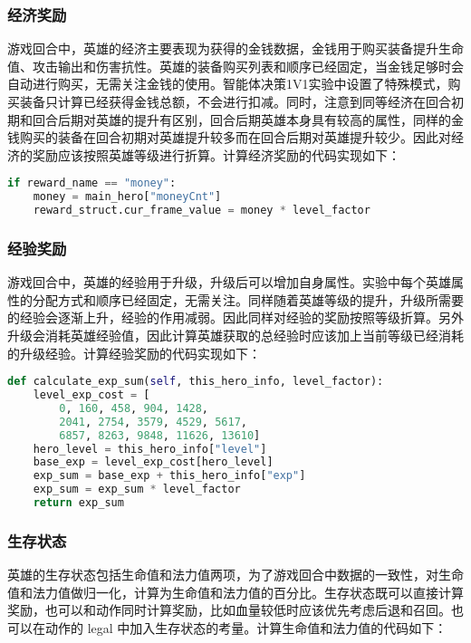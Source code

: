 \subsubsection{经济奖励}

游戏回合中，英雄的经济主要表现为获得的金钱数据，金钱用于购买装备提升生命值、攻击输出和伤害抗性。英雄的装备购买列表和顺序已经固定，当金钱足够时会自动进行购买，无需关注金钱的使用。智能体决策1V1实验中设置了特殊模式，购买装备只计算已经获得金钱总额，不会进行扣减。同时，注意到同等经济在回合初期和回合后期对英雄的提升有区别，回合后期英雄本身具有较高的属性，同样的金钱购买的装备在回合初期对英雄提升较多而在回合后期对英雄提升较少。因此对经济的奖励应该按照英雄等级进行折算。计算经济奖励的代码实现如下：

\begin{lstlisting}[language=Python]
if reward_name == "money":
    money = main_hero["moneyCnt"]
    reward_struct.cur_frame_value = money * level_factor
\end{lstlisting}

\subsubsection{经验奖励}

游戏回合中，英雄的经验用于升级，升级后可以增加自身属性。实验中每个英雄属性的分配方式和顺序已经固定，无需关注。同样随着英雄等级的提升，升级所需要的经验会逐渐上升，经验的作用减弱。因此同样对经验的奖励按照等级折算。另外升级会消耗英雄经验值，因此计算英雄获取的总经验时应该加上当前等级已经消耗的升级经验。计算经验奖励的代码实现如下：

\begin{lstlisting}[language=Python]
def calculate_exp_sum(self, this_hero_info, level_factor):
    level_exp_cost = [
        0, 160, 458, 904, 1428,
        2041, 2754, 3579, 4529, 5617,
        6857, 8263, 9848, 11626, 13610]
    hero_level = this_hero_info["level"]
    base_exp = level_exp_cost[hero_level]
    exp_sum = base_exp + this_hero_info["exp"]
    exp_sum = exp_sum * level_factor
    return exp_sum
\end{lstlisting}

\subsubsection{生存状态}

英雄的生存状态包括生命值和法力值两项，为了游戏回合中数据的一致性，对生命值和法力值做归一化，计算为生命值和法力值的百分比。生存状态既可以直接计算奖励，也可以和动作同时计算奖励，比如血量较低时应该优先考虑后退和召回。也可以在动作的 legal 中加入生存状态的考量。计算生命值和法力值的代码如下：

